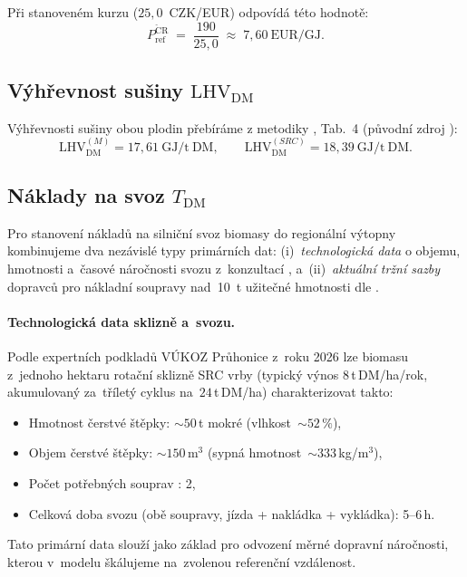 Při stanoveném kurzu ($25{,}0$~CZK/EUR) odpovídá 
této hodnotě:
\begin{equation}
P_\mathrm{ref}^{\mathrm{\check{C}R}} \;=\; \frac{190}{25{,}0} \;\approx\; 7{,}60~\mathrm{EUR/GJ}.
\label{eq:pref_konverze}
\end{equation}


\subsection{Výhřevnost sušiny $\mathrm{LHV}_\mathrm{DM}$}
\label{sec:cena_lhv}

Výhřevnosti sušiny obou plodin přebíráme z metodiky 
\citet{ThetaMetodika2024}, Tab.~4 (původní zdroj 
\citet{HavlickovaWegerKnapek2011}):
\begin{equation}
\mathrm{LHV}_\mathrm{DM}^{(M)} = 17{,}61~\mathrm{GJ/t~DM}, \qquad
\mathrm{LHV}_\mathrm{DM}^{(SRC)} = 18{,}39~\mathrm{GJ/t~DM}.
\label{eq:lhv_dm}
\end{equation}



\subsection{Náklady na svoz $T_\mathrm{DM}$}
\label{sec:cena_doprava}

Pro stanovení nákladů na silniční svoz biomasy do regionální výtopny 
kombinujeme dva nezávislé typy primárních dat: (i)~\emph{technologická data}
o objemu, hmotnosti a~časové náročnosti svozu z~konzultací 
\citep{VUKOZ2026}, a~(ii)~\emph{aktuální tržní sazby} dopravců pro 
nákladní soupravy nad~10~t užitečné hmotnosti dle 
\citep{AKOBlatny2025}.

\paragraph{Technologická data sklizně a~svozu.}
Podle expertních podkladů VÚKOZ Průhonice z~roku 2026 lze 
biomasu z~jednoho hektaru rotační sklizně SRC vrby (typický výnos 
$8\,$t\,DM/ha/rok, akumulovaný za~tříletý cyklus na~$24\,$t\,DM/ha) 
charakterizovat takto:
\begin{itemize}
    \item Hmotnost čerstvé štěpky: $\sim 50\,$t mokré (vlhkost~$\sim 52\,\%$),
    \item Objem čerstvé štěpky: $\sim 150\,$m$^3$ (sypná hmotnost~$\sim 333\,$kg/m$^3$),
    \item Počet potřebných souprav : 2,
    \item Celková doba svozu (obě soupravy, jízda + nakládka + vykládka): 5--6\,h.
\end{itemize}
Tato primární data slouží jako základ pro odvození měrné dopravní 
náročnosti, kterou v~modelu škálujeme na~zvolenou referenční vzdálenost.

